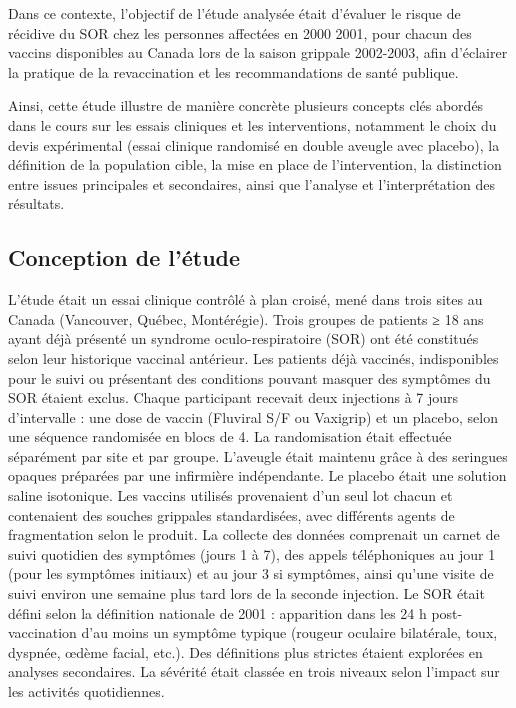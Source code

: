 \documentclass[
]{article}
\begin{document}
Dans ce contexte, l'objectif de l'étude analysée était d'évaluer le
risque de récidive du SOR chez les personnes affectées en 2000 2001,
pour chacun des vaccins disponibles au Canada lors de la saison grippale
2002-2003, afin d'éclairer la pratique de la revaccination et les
recommandations de santé publique.

Ainsi, cette étude illustre de manière concrète plusieurs concepts clés
abordés dans le cours sur les essais cliniques et les interventions,
notamment le choix du devis expérimental (essai clinique randomisé en
double aveugle avec placebo), la définition de la population cible, la
mise en place de l'intervention, la distinction entre issues principales
et secondaires, ainsi que l'analyse et l'interprétation des résultats.

\subsection{Conception de l'étude}\label{conception-de-luxe9tude}

L'étude était un essai clinique contrôlé à plan croisé, mené dans trois
sites au Canada (Vancouver, Québec, Montérégie). Trois groupes de
patients ≥ 18 ans ayant déjà présenté un syndrome oculo-respiratoire
(SOR) ont été constitués selon leur historique vaccinal antérieur. Les
patients déjà vaccinés, indisponibles pour le suivi ou présentant des
conditions pouvant masquer des symptômes du SOR étaient exclus. Chaque
participant recevait deux injections à 7 jours d'intervalle : une dose
de vaccin (Fluviral S/F ou Vaxigrip) et un placebo, selon une séquence
randomisée en blocs de 4. La randomisation était effectuée séparément
par site et par groupe. L'aveugle était maintenu grâce à des seringues
opaques préparées par une infirmière indépendante. Le placebo était une
solution saline isotonique. Les vaccins utilisés provenaient d'un seul
lot chacun et contenaient des souches grippales standardisées, avec
différents agents de fragmentation selon le produit. La collecte des
données comprenait un carnet de suivi quotidien des symptômes (jours 1 à
7), des appels téléphoniques au jour 1 (pour les symptômes initiaux) et
au jour 3 si symptômes, ainsi qu'une visite de suivi environ une semaine
plus tard lors de la seconde injection. Le SOR était défini selon la
définition nationale de 2001 : apparition dans les 24 h post-vaccination
d'au moins un symptôme typique (rougeur oculaire bilatérale, toux,
dyspnée, œdème facial, etc.). Des définitions plus strictes étaient
explorées en analyses secondaires. La sévérité était classée en trois
niveaux selon l'impact sur les activités quotidiennes.
\end{document}
